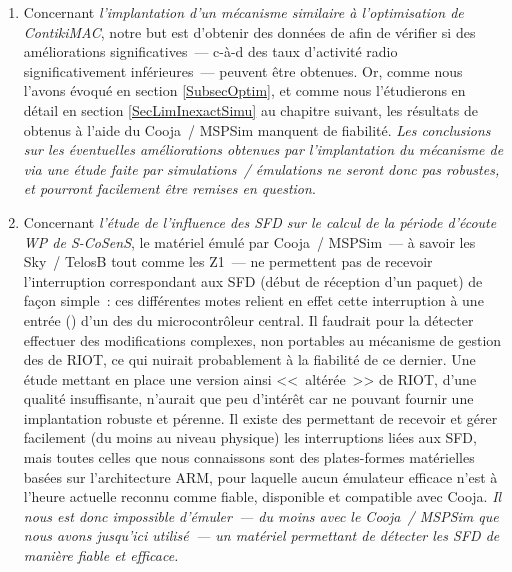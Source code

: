 \begin{enumerate}

\item Concernant \emph{l'implantation d'un mécanisme similaire à
l'optimisation  de ContikiMAC}, notre but est
d'obtenir des données de  afin de vérifier si des
améliorations significatives~--- c-à-d des taux d'activité radio
significativement inférieures~--- peuvent être obtenues. Or, comme nous
l'avons évoqué en section \vref{SubsecOptim}, et comme nous l'étudierons
en détail en section \vref{SecLimInexactSimu} au chapitre suivant, les
résultats de  obtenus à l'aide du 
Cooja~/ MSPSim manquent de fiabilité. \emph{Les conclusions sur les
éventuelles améliorations obtenues par l'implantation du mécanisme de
 via une étude faite par simulations~/ émulations
ne seront donc pas robustes, et pourront facilement être remises
en question}.

\item Concernant \emph{l'étude de l'influence des SFD sur le calcul
de la période d'écoute WP de S-CoSenS}, le matériel émulé par Cooja~/
MSPSim~--- à savoir les  Sky~/ TelosB tout comme les Z1~---
ne permettent pas de recevoir l'interruption correspondant aux SFD (début
de réception d'un paquet) de façon simple~: ces différentes motes relient
en effet cette interruption à une entrée () d'un des
 du microcontrôleur central. Il faudrait pour la détecter
effectuer des modifications complexes, non portables au mécanisme de
gestion des  de RIOT, ce qui nuirait probablement à la
fiabilité de ce dernier. Une étude mettant en place une version ainsi
<<~altérée~>> de RIOT, d'une qualité insuffisante, n'aurait que peu
d'intérêt car ne pouvant fournir une implantation robuste et pérenne.
Il existe des  permettant de recevoir et gérer facilement
(du moins au niveau physique) les interruptions liées aux SFD, mais toutes
celles que nous connaissons sont des plates-formes matérielles basées sur
l'architecture ARM, pour laquelle aucun émulateur efficace n'est à l'heure
actuelle reconnu comme fiable, disponible et compatible avec Cooja.
\emph{Il nous est donc impossible d'émuler~--- du moins avec le
 Cooja~/ MSPSim que nous avons jusqu'ici utilisé~---
un matériel permettant de détecter les SFD de manière fiable et efficace.}


\end{enumerate}

